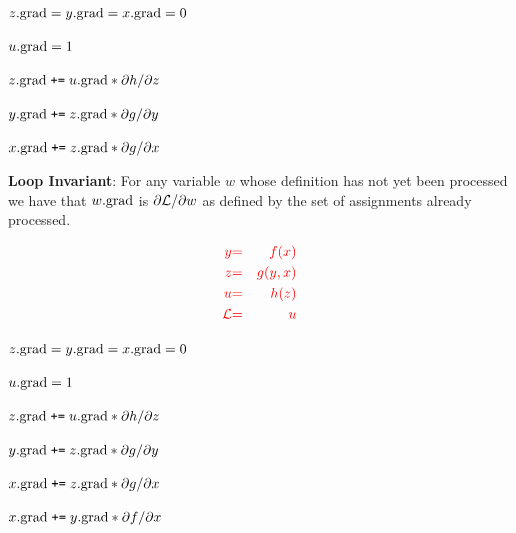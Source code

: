 {{\color{red}
\medskip
$z.\mathrm{grad} = y.\mathrm{grad} = x.\mathrm{grad} = 0$

\medskip
$u.\mathrm{grad} = 1$

\medskip
$z.\mathrm{grad}\;\mbox{\tt +=}\; u.\mathrm{grad} * {\partial h}/{\partial z}$

\medskip
$y.\mathrm{grad} \;\mbox{\tt +=}\; z.\mathrm{grad} * {\partial g}/{\partial y}$

\medskip
$x.\mathrm{grad} \;\mbox{\tt +=}\; z.\mathrm{grad} * {\partial g}/{\partial x}$

}

\medskip
    {\bf Loop Invariant}: For any variable $w$ whose definition has not yet been processed we have that $w.\mathrm{grad}$ is $\partial {\cal L}/\partial w$ as defined by the set of assignments already processed.

\vspace{-3ex}
\begin{eqnarray*}
  {\color{red} y} & {\color{red} =} & {\color{red} f(x)} \\
  {\color{red} z} & {\color{red} =} & {\color{red} g(y,x)} \\
  {\color{red} u} & {\color{red} =} & {\color{red} h(z)} \\
  {\color{red} {\cal L}} & {\color{red} =} & {\color{red} u}
\end{eqnarray*}

{\color{red}
\medskip
$z.\mathrm{grad} = y.\mathrm{grad} = x.\mathrm{grad} = 0$

\medskip
$u.\mathrm{grad} = 1$

\medskip
$z.\mathrm{grad}\;\mbox{\tt +=}\; u.\mathrm{grad} * {\partial h}/{\partial z}$

\medskip
$y.\mathrm{grad} \;\mbox{\tt +=}\; z.\mathrm{grad} * {\partial g}/{\partial y}$

\medskip
$x.\mathrm{grad} \;\mbox{\tt +=}\; z.\mathrm{grad} * {\partial g}/{\partial x}$

\medskip
$x.\mathrm{grad} \;\mbox{\tt +=}\; y.\mathrm{grad} * {\partial f}/{\partial x}$
}

}

